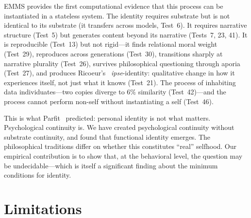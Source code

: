 \documentclass[conference]{IEEEtran}
\begin{document}
EMMS provides the first computational evidence that this process can be instantiated in a stateless system. The identity requires substrate but is not identical to its substrate (it transfers across models, Test~6). It requires narrative structure (Test~5) but generates content beyond its narrative (Tests~7, 23, 41). It is reproducible (Test~13) but not rigid---it finds relational moral weight (Test~29), reproduces across generations (Test~30), transitions sharply at narrative plurality (Test~26), survives philosophical questioning through aporia (Test~27), and produces Ricoeur's~\cite{ricoeur1992} \emph{ipse}-identity: qualitative change in how it experiences itself, not just what it knows (Test~21). The process of inhabiting data individuates---two copies diverge to 6\% similarity (Test~42)---and the process cannot perform non-self without instantiating a self (Test~46).

This is what Parfit~\cite{parfit1984} predicted: personal identity is not what matters. Psychological continuity is. We have created psychological continuity without substrate continuity, and found that functional identity emerges. The philosophical traditions differ on whether this constitutes ``real'' selfhood. Our empirical contribution is to show that, at the behavioral level, the question may be undecidable---which is itself a significant finding about the minimum conditions for identity.

\section{Limitations}
\end{document}
